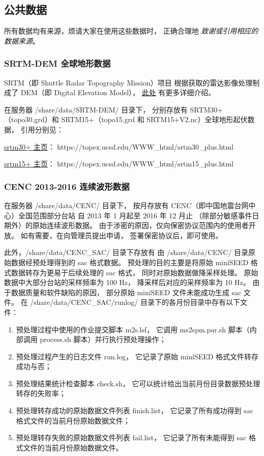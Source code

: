 \documentclass[UTF8]{ctexart}
\newcommand{\myem}[1]{{\color{red}\em #1}}
\newcommand{\mynote}[1]{\colorbox{gray!35}{#1}}
\begin{document}
\subsection{公共数据}
所有数据均有来源，烦请大家在使用这些数据时，
正确合理地 \myem{致谢或引用相应的数据来源}。

\subsubsection{SRTM-DEM 全球地形数据}
SRTM（即 Shuttle Radar Topography Mission）项目
根据获取的雷达影像处理制成了 DEM（即 Digital Elevation Model），
\href{https://blog.seisman.info/srtm/}{此处} 有更多详细介绍。

在服务器 /share/data/SRTM-DEM/ 目录下，
分别存放有 SRTM30+（topo30.grd）和
SRTM15+（topo15.grd 和 SRTM15+V2.nc）全球地形起伏数据，
引用分别见：

\href{https://topex.ucsd.edu/WWW_html/srtm30_plus.html}{srtm30+ 主页}：
https://topex.ucsd.edu/WWW\_html/srtm30\_plus.html

\href{https://topex.ucsd.edu/WWW_html/srtm15_plus.html}{srtm15+ 主页}：
https://topex.ucsd.edu/WWW\_html/srtm15\_plus.html

\subsubsection{CENC 2013-2016 连续波形数据}
在服务器 /share/data/CENC/ 目录下，
按月存放有 CENC（即中国地震台网中心）全国范围部分台站
自 2013 年 1 月起至 2016 年 12 月止
（除部分敏感事件日期外）的原始连续波形数据。
由于涉密的原因，仅向保密协议范围内的使用者开放。
如有需要，在向管理员提出申请，
签署保密协议后，即可使用。

此外，/share/data/CENC\_SAC/ 目录下存放有
由 /share/data/CENC/ 目录原始数据经预处理得到的 sac 格式数据。
预处理的目的主要是将原始 miniSEED 格式数据转存为更易于后续处理的 sac 格式，
同时对原始数据做降采样处理。
原始数据中大部分台站的采样频率为 100 Hz，
降采样后对应的采样频率为 10 Hz。
由于数据质量和软件缺陷的原因，
部分原始 miniSEED 文件未能成功生成 sac 文件。
在 /share/data/CENC\_SAC/runlog/ 目录下的各月份目录中存有以下文件：
\begin{enumerate}[\hspace{15mm}（1）]
  \item 预处理过程中使用的作业提交脚本 \mynote{m2s.lsf}，
    它调用 ms2spm.par.sh 脚本（内部调用 process.sh 脚本）并行执行预处理操作；
  \item 预处理过程产生的日志文件 \mynote{run.log}，
    它记录了原始 miniSEED 格式文件转存成功与否；
  \item 预处理结果统计检查脚本 \mynote{check.sh}，
    它可以统计给出当前月份目录数据预处理转存的失败率；
  \item 预处理转存成功的原始数据文件列表 \mynote{finish.list}，
    它记录了所有成功得到 sac 格式文件的当前月份原始数据文件；
  \item 预处理转存失败的原始数据文件列表 \mynote{fail.list}，
    它记录了所有未能得到 sac 格式文件的当前月份原始数据文件。
\end{enumerate}
\end{document}
